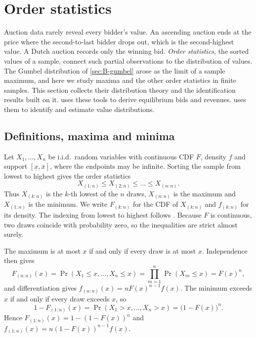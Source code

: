 \section{Order statistics}\label{sec:B-orderstats}

Auction data rarely reveal every bidder's value. An ascending auction ends at the price where the
second-to-last bidder drops out, which is the second-highest value. A Dutch auction records only the
winning bid. \emph{Order statistics}, the sorted values of a sample, connect such partial observations to
the distribution of values. The Gumbel distribution of \cref{sec:B-gumbel} arose as the limit of a sample
maximum, and here we study maxima and the other order statistics in finite samples. This section collects their
distribution theory and the identification results built on it.  uses these tools to derive equilibrium bids and revenues.
 uses them to identify and estimate value distributions.

\subsection{Definitions, maxima and minima}\label{sec:B-os-def}

Let $X_1, \dots, X_n$ be i.i.d.\ random variables with continuous CDF $F$, density $f$ and support
$[\underline x, \bar x]$, where the endpoints may be infinite. Sorting the sample from lowest to highest
gives the order statistics
\begin{equation*}
  X_{(1:n)} \leq X_{(2:n)} \leq \dots \leq X_{(n:n)}.
\end{equation*}
Thus $X_{(k:n)}$ is the $k$-th lowest of the $n$ draws, $X_{(n:n)}$ is the maximum and $X_{(1:n)}$ is the
minimum. We write $F_{(k:n)}$ for the CDF of $X_{(k:n)}$ and $f_{(k:n)}$ for its density. The indexing from
lowest to highest follows \citet[Section~2.1]{AtheyHaile2007}. Because $F$ is continuous, two draws coincide
with probability zero, so the inequalities are strict almost surely.

The maximum is at most $x$ if and only if every draw is at most $x$. Independence then gives
\begin{equation}\label{eq:B-os-max}
  F_{(n:n)}(x) = \Pr(X_1 \leq x, \dots, X_n \leq x) = \prod_{m=1}^{n}\Pr(X_m \leq x) = F(x)^n,
\end{equation}
and differentiation gives $f_{(n:n)}(x) = nF(x)^{n-1}f(x)$. The minimum exceeds $x$ if and only if every
draw exceeds $x$, so
\begin{equation}\label{eq:B-os-min}
  1 - F_{(1:n)}(x) = \Pr(X_1 > x, \dots, X_n > x) = \big(1 - F(x)\big)^n.
\end{equation}
Hence $F_{(1:n)}(x) = 1 - (1 - F(x))^n$ and $f_{(1:n)}(x) = n(1 - F(x))^{n-1}f(x)$.

